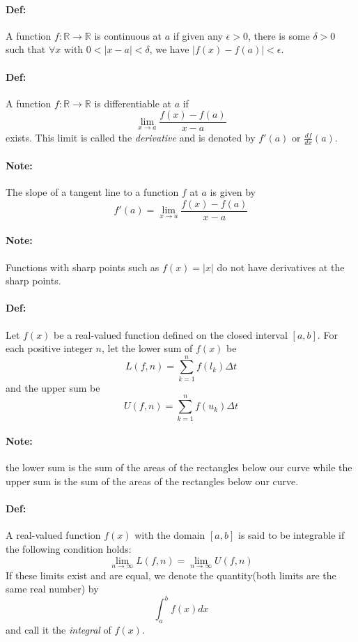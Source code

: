 \documentclass[10pt,a4paper]{article}
\begin{document}
\paragraph{Def:} A function $f:\mathbb{R} \to \mathbb{R}$ is continuous at $a$ if given any $\epsilon>0$, there is some $\delta>0$ such that $\forall x$ with $0 < |x-a| < \delta$, we have $|f(x) - f(a)| < \epsilon$. 

\paragraph{Def:} A function $f: \mathbb{R} \to \mathbb{R}$ is differentiable at $a$ if 
$$ \lim_{x \to a} \frac{f(x)-f(a)}{x-a}$$
exists. This limit is called the \textit{derivative} and is denoted by $f'(a)$ or $\frac{df}{dx}(a)$.

\paragraph{Note:} The slope of a tangent line to a function $f$ at $a$ is given by 
$$ f'(a) = \lim_{x \to a} \frac{f(x)-f(a)}{x-a}$$

\paragraph{Note:} Functions with sharp points such as $f(x) = |x|$ do not have derivatives at the sharp points.

\paragraph{Def:} Let $f(x)$ be a real-valued function defined on the closed interval $[a,b]$. For each positive integer $n$, let the lower sum of $f(x)$ be
$$ L(f,n) = \sum_{k=1}^n f(l_k) \Delta t$$
and the upper sum be
$$ U(f,n) = \sum_{k=1}^n f(u_k)\Delta t$$

\paragraph{Note:} the lower sum is the sum of the areas of the rectangles below our curve while the upper sum is the sum of the areas of the rectangles below our curve.

\paragraph{Def:} A real-valued function $f(x)$ with the domain $[a,b]$ is said to be integrable if the following condition holds:
$$ \lim_{n \to \infty} L(f,n) = \lim_{n \to \infty} U(f,n)$$
If these limits exist and are equal, we denote the quantity(both limits are the same real number) by 
$$ \int_a^b f(x)dx$$
and call it the \textit{integral} of $f(x)$.
\end{document}
